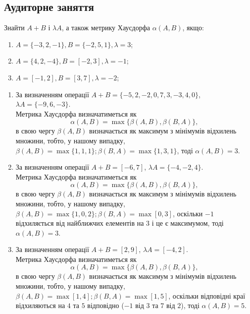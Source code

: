 \subsection{Аудиторне заняття}

\begin{problem}
	Знайти $A + B$ і $\lambda A$, а також метрику Хаусдорфа $\alpha (A, B)$, якщо:
	
	\begin{enumerate}
	    \item $A = \{-3, 2, -1\},  B = \{-2, 5, 1\},  \lambda = 3$;
	    
	    \item $A = \{4, 2, -4\},  B = [-2, 3],  \lambda = -1$;
	    
	    \item $A = [-1, 2],  B = [3, 7],  \lambda = -2$;
	    
	\end{enumerate}
	
\end{problem}

\begin{solution}

	\begin{enumerate}
	    \item За визначенням операції $A + B = \{-5, 2, -2, 0, 7, 3, -3, 4, 0\}$, $\lambda A = \{-9, 6, -3 \}$. \\
	    
	    Метрика Хаусдорфа визначатиметься як \[\alpha (A, B) = \max\{\beta (A, B), \beta (B, A)\},\] в свою чергу $\beta (A, B)$ визначається як максимум з мінімумів відхилень множини, тобто, у нашому випадку, $\beta (A, B) = \max\{1, 1, 1\}; \beta (B, A) = \max\{1, 3, 1\}$, тоді $\alpha (A, B) = 3$.
	    
	    \item За визначенням операції $A + B = [-6,7]$, $\lambda A = \{-4, -2, 4 \}$.\\
	    
	    Метрика Хаусдорфа визначатиметься як \[\alpha (A, B) = \max\{\beta (A, B), \beta (B, A)\},\] в свою чергу $\beta (A, B)$ визначається як максимум з мінімумів відхилень множини, тобто, у нашому випадку, $\beta (A, B) = \max\{1, 0, 2\}; \beta (B, A) = \max[0, 3]$, оскільки $-1$ відхиляється від найближчих елементів на $3$ і це є максимумом, тоді $\alpha (A, B) = 3$.
	    
	    \item За визначенням операції $A + B = [2,9]$, $\lambda A = [-4,2]$. \\
	    
	    Метрика Хаусдорфа визначатиметься як \[\alpha (A, B) = \max\{\beta (A, B), \beta (B, A)\},\] в свою чергу $\beta (A, B)$ визначається як максимум з мінімумів відхилень множини, тобто, у нашому випадку, $\beta (A, B) = \max[1,4]; \beta (B, A) = \max[1, 5]$, оскільки відповідні краї відхиляються на $4$ та $5$ відповідно ($-1$ від $3$ та $7$ від $2$), тоді $\alpha (A, B) = 5$.
	    
	\end{enumerate}
	
\end{solution}

